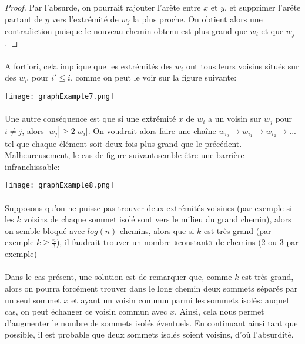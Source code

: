 \documentclass[a4paper]{article}
\theoremstyle{definition}
\theoremstyle{remark}
\begin{document}
\begin{proof}
Par l'absurde, on pourrait rajouter l'arête entre $x$ et $y$, et
supprimer l'arête partant de $y$ vers l'extrémité de $w_{j}$ la plus
proche. On obtient alors une contradiction puisque le nouveau chemin obtenu est plus grand que $w_{i}$ et que $w_{j}$.
\end{proof}


\paragraph{}
A fortiori, cela implique que les extrémités des $w_{i}$ ont tous leurs
voisins situés sur des $w_{i'}$ pour $i' \leq i$, comme on peut le voir 
sur la figure suivante:

\texttt{[image: graphExample7.png]}

\paragraph{}
Une autre conséquence est que si une extrémité $x$ de $w_{i}$ a un voisin sur $w_{j}$ pour $i \neq j$, alors $|w_{j}| \geq 2|w_{i}|$. On 
voudrait alors faire une chaîne $w_{i_{0}} \rightarrow w_{i_{1}} \rightarrow w_{i_{2}} \rightarrow ...$ tel que chaque élément soit deux 
fois plus grand que le précédent. Malheureusement, le cas de figure 
suivant semble être une barrière infranchissable:

\texttt{[image: graphExample8.png]}

\paragraph{}
Supposons qu'on ne puisse pas trouver deux extrémités voisines (par exemple si les $k$ voisins de chaque sommet isolé sont vers le milieu du 
grand chemin), alors on semble bloqué avec $log(n)$ chemins, alors que si $k$ est très grand (par exemple $k \geq \frac{n}{3}$), il faudrait trouver un nombre «constant» de chemins (2 ou 3 par exemple)

\paragraph{}
Dans le cas présent, une solution est de remarquer que, comme $k$ est 
très grand, alors on pourra forcément trouver dans le long chemin deux 
sommets séparés par un seul sommet $x$ et ayant un voisin commun parmi les sommets isolés: auquel cas, on peut échanger ce voisin commun avec $x$. Ainsi, cela nous permet d'augmenter le nombre de sommets isolés 
éventuels. En continuant ainsi tant que possible, il est probable que 
deux sommets isolés soient voisins, d'où l'absurdité.
\end{document}
